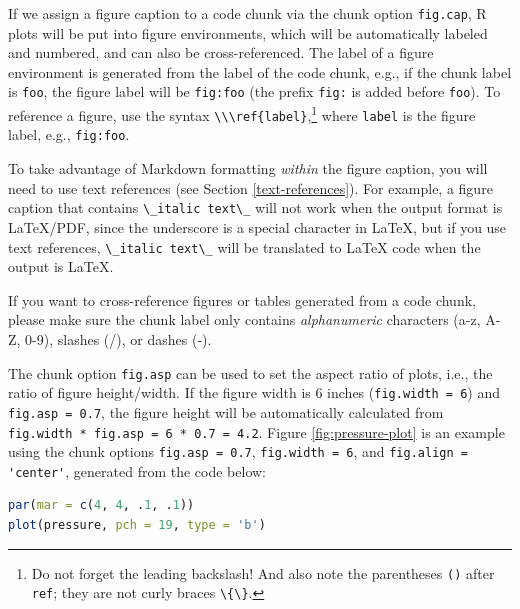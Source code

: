 \documentclass[doctor,openright,twoside]{sjtuthesis}
\newcommand{\passthrough}[1]{#1}
\theoremstyle{plain}
\theoremstyle{definition}
\theoremstyle{remark}
\theoremstyle{ocrenumbox}
\theoremstyle{plain}
\let\BeginKnitrBlock\begin \let\EndKnitrBlock\end
\begin{document}
If we assign a figure caption to a code chunk via the chunk option
\passthrough{\lstinline!fig.cap!}, R plots will be put into figure
environments, which will be automatically labeled and numbered, and can
also be cross-referenced. The label of a figure environment is generated
from the label of the code chunk, e.g., if the chunk label is
\passthrough{\lstinline!foo!}, the figure label will be
\passthrough{\lstinline!fig:foo!} (the prefix
\passthrough{\lstinline!fig:!} is added before
\passthrough{\lstinline!foo!}). To reference a
figure, use the syntax
\passthrough{\lstinline!\\\ref{label}!},\footnote{Do not forget the
  leading backslash! And also note the parentheses
  \passthrough{\lstinline!()!} after \passthrough{\lstinline!ref!}; they
  are not curly braces \passthrough{\lstinline!\{\}!}.} where
\passthrough{\lstinline!label!} is the figure label, e.g.,
\passthrough{\lstinline!fig:foo!}.

To take advantage of Markdown formatting \emph{within} the figure
caption, you will need to use text references (see Section
\ref{text-references}). For example, a figure caption that contains
\passthrough{\lstinline!\_italic text\_!} will not work when the output
format is LaTeX/PDF, since the underscore is a special character in
LaTeX, but if you use text references,
\passthrough{\lstinline!\_italic text\_!} will be translated to LaTeX
code when the output is LaTeX.

\BeginKnitrBlock{rmdimportant}
If you want to cross-reference figures or tables generated from a code
chunk, please make sure the chunk label only contains
\emph{alphanumeric} characters (a-z, A-Z, 0-9), slashes (/), or dashes
(-).
\EndKnitrBlock{rmdimportant}

The chunk option \passthrough{\lstinline!fig.asp!} can be used to set
the aspect ratio of plots, i.e., the ratio of figure height/width. If
the figure width is 6 inches (\passthrough{\lstinline!fig.width = 6!})
and \passthrough{\lstinline!fig.asp = 0.7!}, the figure height will be
automatically calculated from
\passthrough{\lstinline!fig.width * fig.asp = 6 * 0.7 = 4.2!}. Figure
\ref{fig:pressure-plot} is an example using the chunk options
\passthrough{\lstinline!fig.asp = 0.7!},
\passthrough{\lstinline!fig.width = 6!}, and
\passthrough{\lstinline!fig.align = 'center'!}, generated from the code
below:

\begin{lstlisting}[language=R]
par(mar = c(4, 4, .1, .1))
plot(pressure, pch = 19, type = 'b')
\end{lstlisting}
\end{document}
